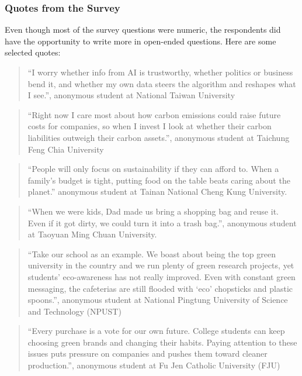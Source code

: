\documentclass[
  12pt,
  letterpaper,
  DIV=11,
  numbers=noendperiod]{scrartcl}
\begin{document}
\subsubsection{Quotes from the Survey}\label{quotes-from-the-survey}

Even though most of the survey questions were numeric, the respondents
did have the opportunity to write more in open-ended questions. Here are
some selected quotes:

\begin{quote}
``I worry whether info from AI is trustworthy, whether politics or
business bend it, and whether my own data steers the algorithm and
reshapes what I see.'', anonymous student at National Taiwan University
\end{quote}

\begin{quote}
``Right now I care most about how carbon emissions could raise future
costs for companies, so when I invest I look at whether their carbon
liabilities outweigh their carbon assets.'', anonymous student at
Taichung Feng Chia University
\end{quote}

\begin{quote}
``People will only focus on sustainability if they can afford to. When a
family's budget is tight, putting food on the table beats caring about
the planet.'' anonymous student at Tainan National Cheng Kung
University.
\end{quote}

\begin{quote}
``When we were kids, Dad made us bring a shopping bag and reuse it. Even
if it got dirty, we could turn it into a trash bag.'', anonymous student
at Taoyuan Ming Chuan University.
\end{quote}

\begin{quote}
``Take our school as an example. We boast about being the top green
university in the country and we run plenty of green research projects,
yet students' eco-awareness has not really improved. Even with constant
green messaging, the cafeterias are still flooded with `eco' chopsticks
and plastic spoons.'', anonymous student at National Pingtung University
of Science and Technology (NPUST)
\end{quote}

\begin{quote}
``Every purchase is a vote for our own future. College students can keep
choosing green brands and changing their habits. Paying attention to
these issues puts pressure on companies and pushes them toward cleaner
production.'', anonymous student at Fu Jen Catholic University (FJU)
\end{quote}
\end{document}
